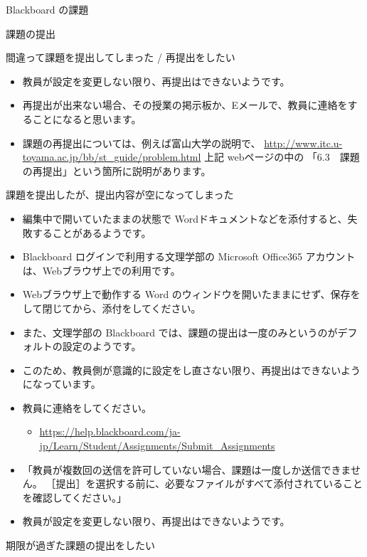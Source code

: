 \documentclass[a4j,10pt]{jsarticle}
\begin{document}
{\begin{frame}[label={sec:org6cf18dd},fragile]{Blackboard の課題}
\begin{block}{課題の提出}
\begin{block}{間違って課題を提出してしまった / 再提出をしたい}
\begin{itemize}
\par
\item 教員が設定を変更しない限り、再提出はできないようです。
\item 再提出が出来ない場合、その授業の掲示板か、Eメールで、教員に連絡をすることになると思います。
\par
\item 課題の再提出については、例えば富山大学の説明で、
\url{http://www.itc.u-toyama.ac.jp/bb/st\_guide/problem.html}
上記 webページの中の 「6.3　課題の再提出」という箇所に説明があります。
\end{itemize}
\end{block}
\par
\begin{block}{課題を提出したが、提出内容が空になってしまった}
\begin{itemize}
\item 編集中で開いていたままの状態で Wordドキュメントなどを添付すると、失敗することがあるようです。
\item Blackboard ログインで利用する文理学部の Microsoft Office365 アカウントは、Webブラウザ上での利用です。
\item Webブラウザ上で動作する Word のウィンドウを開いたままにせず、保存をして閉じてから、添付をしてください。
\par
\item また、文理学部の Blackboard では、課題の提出は一度のみというのがデフォルトの設定のようです。
\item このため、教員側が意識的に設定をし直さない限り、再提出はできないようになっています。
\item 教員に連絡をしてください。
\begin{itemize}
\item \url{https://help.blackboard.com/ja-jp/Learn/Student/Assignments/Submit\_Assignments}
\end{itemize}
\par
\item 「教員が複数回の送信を許可していない場合、課題は一度しか送信できません。
［提出］を選択する前に、必要なファイルがすべて添付されていることを確認してください。」
\par
\item 教員が設定を変更しない限り、再提出はできないようです。
\end{itemize}
\end{block}
\par
\begin{block}{期限が過ぎた課題の提出をしたい}
\begin{itemize}

\end{itemize}
\end{block}
\end{block}
\end{frame}}
\end{document}
